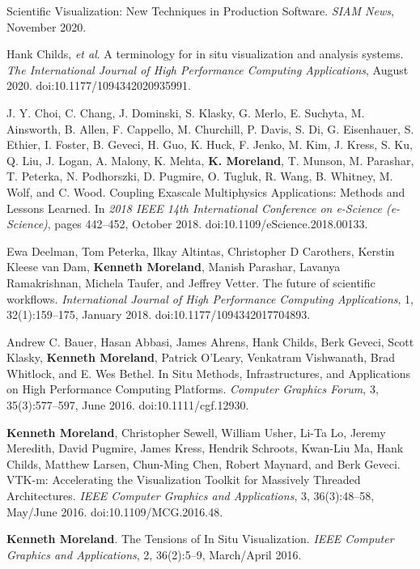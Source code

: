 \begin{enumerate}[label={[\arabic*]}, left=0pt]
  Scientific Visualization: New Techniques in Production Software.
  \emph{SIAM News}, November 2020.
\item  %
  Hank Childs, \emph{et al}.
  A terminology for in situ visualization and analysis systems.
  \emph{The International Journal of High Performance Computing Applications}, August 2020.
  doi:10.1177/1094342020935991.
\item  %
  J. Y. Choi, C. Chang, J. Dominski, S. Klasky, G. Merlo, E. Suchyta, M. Ainsworth, B. Allen, F. Cappello, M. Churchill, P. Davis, S. Di, G. Eisenhauer, S. Ethier, I. Foster, B. Geveci, H. Guo, K. Huck, F. Jenko, M. Kim, J. Kress, S. Ku, Q. Liu, J. Logan, A. Malony, K. Mehta, \textbf{K. Moreland}, T. Munson, M. Parashar, T. Peterka, N. Podhorszki, D. Pugmire, O. Tugluk, R. Wang, B. Whitney, M. Wolf, and C. Wood.
  Coupling Exascale Multiphysics Applications: Methods and Lessons Learned.
  In \emph{2018 IEEE 14th International Conference on e-Science (e-Science)}, pages 442--452, October 2018.
  doi:10.1109/eScience.2018.00133.
\item  %
  Ewa Deelman, Tom Peterka, Ilkay Altintas, Christopher D Carothers, Kerstin Kleese van Dam, \textbf{Kenneth Moreland}, Manish Parashar, Lavanya Ramakrishnan, Michela Taufer, and Jeffrey Vetter.
  The future of scientific workflows.
  \emph{International Journal of High Performance Computing Applications}, 1, 32(1):159--175, January 2018.
  doi:10.1177/1094342017704893.
\item  %
  Andrew C. Bauer, Hasan Abbasi, James Ahrens, Hank Childs, Berk Geveci, Scott Klasky, \textbf{Kenneth Moreland}, Patrick O'Leary, Venkatram Vishwanath, Brad Whitlock, and E. Wes Bethel.
  In Situ Methods, Infrastructures, and Applications on High Performance Computing Platforms.
  \emph{Computer Graphics Forum}, 3, 35(3):577--597, June 2016.
  doi:10.1111/cgf.12930.
\item  %
  \textbf{Kenneth Moreland}, Christopher Sewell, William Usher, Li-Ta Lo, Jeremy Meredith, David Pugmire, James Kress, Hendrik Schroots, Kwan-Liu Ma, Hank Childs, Matthew Larsen, Chun-Ming Chen, Robert Maynard, and Berk Geveci.
  {VTK-m}: Accelerating the Visualization Toolkit for Massively Threaded Architectures.
  \emph{IEEE Computer Graphics and Applications}, 3, 36(3):48--58, May/June 2016.
  doi:10.1109/MCG.2016.48.
\item  %
  \textbf{Kenneth Moreland}.
  The Tensions of In Situ Visualization.
  \emph{IEEE Computer Graphics and Applications}, 2, 36(2):5--9, March/April 2016.

\end{enumerate}
